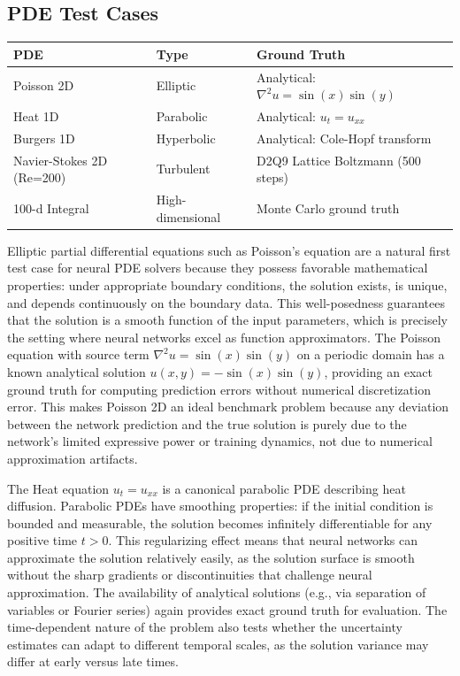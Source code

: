 \documentclass[12pt,a4paper]{article}
\theoremstyle{plain}
\begin{document}
\subsection{PDE Test Cases}

\begin{tabular}{llp{6cm}}
    \toprule
    \textbf{PDE} & \textbf{Type} & \textbf{Ground Truth} \\
    \midrule
    Poisson 2D & Elliptic & Analytical: $\nabla^2 u = \sin(x)\sin(y)$ \\
    Heat 1D & Parabolic & Analytical: $u_t = u_{xx}$ \\
    Burgers 1D & Hyperbolic & Analytical: Cole-Hopf transform \\
    Navier-Stokes 2D (Re=200) & Turbulent & D2Q9 Lattice Boltzmann (500 steps) \\
    100-d Integral & High-dimensional & Monte Carlo ground truth \\
    \bottomrule
\end{tabular}

Elliptic partial differential equations such as Poisson's equation are a
natural first test case for neural PDE solvers because they possess favorable
mathematical properties: under appropriate boundary conditions, the solution
exists, is unique, and depends continuously on the boundary data. This
well-posedness guarantees that the solution is a smooth function of the
input parameters, which is precisely the setting where neural networks excel
as function approximators. The Poisson equation with source term
$\nabla^2 u = \sin(x)\sin(y)$ on a periodic domain has a known analytical
solution $u(x,y) = -\sin(x)\sin(y)$, providing an exact ground truth for
computing prediction errors without numerical discretization error. This
makes Poisson 2D an ideal benchmark problem because any deviation between
the network prediction and the true solution is purely due to the network's
limited expressive power or training dynamics, not due to numerical
approximation artifacts.

The Heat equation $u_t = u_{xx}$ is a canonical parabolic PDE describing
heat diffusion. Parabolic PDEs have smoothing properties: if the initial
condition is bounded and measurable, the solution becomes infinitely
differentiable for any positive time $t > 0$. This regularizing effect
means that neural networks can approximate the solution relatively easily,
as the solution surface is smooth without the sharp gradients or discontinuities
that challenge neural approximation. The availability of analytical solutions
(e.g., via separation of variables or Fourier series) again provides exact
ground truth for evaluation. The time-dependent nature of the problem also
tests whether the uncertainty estimates can adapt to different temporal
scales, as the solution variance may differ at early versus late times.
\end{document}
